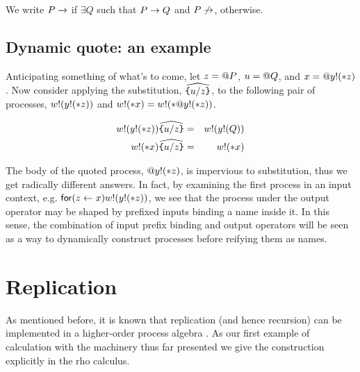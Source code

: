 
We write $P\rightarrow$ if $\exists Q $ such that $ P \rightarrow Q$ and $P\not\rightarrow$, otherwise.

\subsection{ Dynamic quote: an example }

Anticipating something of what's to come, let $z = \mathsf{@} P$, $u = \mathsf{@} Q$, and $x = \mathsf{@} y \mathsf{!}(\mathsf{*} z)$. Now consider applying the substitution,
$\widehat{\texttt{\{}u / z \texttt{\}}}$, to the following pair of processes,
$w \mathsf{!}(y!(\mathsf{*} z))$ and $w \mathsf{!}(\mathsf{*} x) = w \mathsf{!}(\mathsf{*} \mathsf{@} y \mathsf{!}(\mathsf{*} z))$.

\begin{eqnarray}
	w \mathsf{!}(y \mathsf{!}(\mathsf{*} z))\widehat{\texttt{\{}u / z \texttt{\}}}
		& = &
		w \mathsf{!}(y \mathsf{!}(Q)) \nonumber\\
	w \mathsf{!}(\mathsf{*} x) \widehat{ \texttt{\{}u / z \texttt{\}} }
		& = &
		w \mathsf{!}(\mathsf{*} x) \nonumber
\end{eqnarray}

The body of the quoted process, $\mathsf{@} y \mathsf{!}(\mathsf{*} z)$, is
impervious to substitution, thus we get radically different
answers. In fact, by examining the first process in an input context,
e.g. $\mathsf{for}(z \leftarrow x)w \mathsf{!}(y \mathsf{!}(\mathsf{*} z))$, we see that the process
under the output operator may be shaped by prefixed inputs binding a
name inside it. In this sense, the combination of input prefix binding
and output operators will be seen as a way to dynamically construct
processes before reifying them as names.

\section{Replication}

As mentioned before, it is known that replication (and hence
recursion) can be implemented in a higher-order process algebra
\cite{DBLP:books/daglib/0004377}. As our first example of calculation with the
machinery thus far presented we give the construction explicitly in
the rho calculus.

